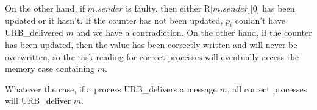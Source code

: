\documentclass{scrartcl}
\begin{document}
On the other hand, if $m.sender$ is faulty, then either R[$m.sender$][0] has been updated or it hasn't. If the counter has not been updated, $p_i$ couldn't have URB\_delivered $m$ and we have a contradiction. On the other hand, if the counter has been updated, then the value has been correctly written and will never be overwritten, so the task reading for correct processes will eventually access the memory case containing $m$.

Whatever the case, if a process URB\_delivers a message $m$, all correct processes will URB\_deliver $m$.
\end{document}
